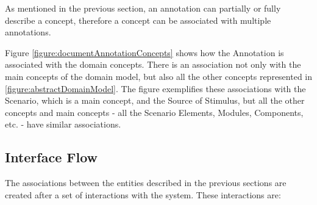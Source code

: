 As mentioned in the previous section, an annotation can partially or fully describe a concept, therefore a concept can be associated with multiple annotations. 

Figure \ref{figure:documentAnnotationConcepts} shows how the Annotation is associated with the domain concepts. There is an association not only with the main concepts of the domain model, but also all the other concepts represented in \ref{figure:abstractDomainModel}. The figure exemplifies these associations with the Scenario, which is a main concept, and the Source of Stimulus, but all the other concepts and main concepts - all the Scenario Elements, Modules, Components, etc. - have similar associations.  

\subsection{Interface Flow}
\label{section:interfaceFlow}

The associations between the entities described in the previous sections are created after a set of interactions with the system. These interactions are:


